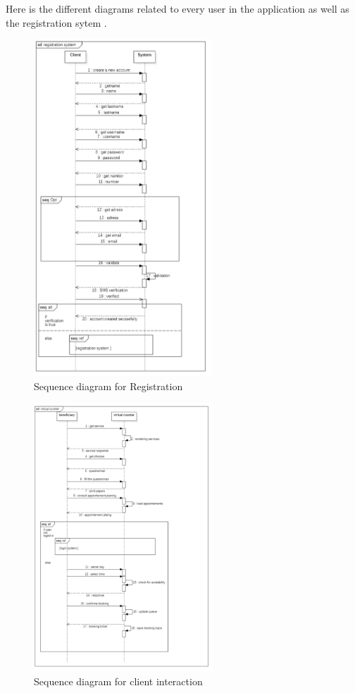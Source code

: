 \medskip Here is the different diagrams related to every user in the application as well as the registration sytem . 
  \begin{figure}[H]
      \centering
      \includegraphics*[width=0.6\textwidth]{registration_sequence.PNG}
      \caption{Sequence diagram for Registration}
      \label{fig:Sequence diagram for Registration}
  \end{figure}
  \begin{figure}[H]
      \centering
      \includegraphics*[width=0.6\textwidth]{sequence_client.PNG}
      \caption{Sequence diagram for client interaction}
      \label{fig:Sequence diagram for Cient Interaction}
  \end{figure}
 
